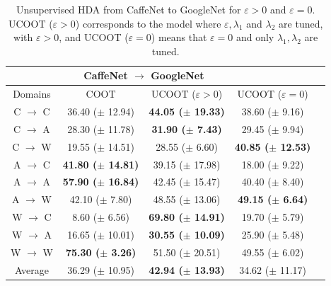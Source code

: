 \begin{table}[H]
	\begin{center}
		\begin{small}
			\begin{sc}
				\begin{tabular}{c c c c c}
					\toprule
					& \multicolumn{2}{c}{CaffeNet $\to$ GoogleNet} \\
					\midrule
					Domains & COOT & UCOOT ($\varepsilon > 0$) & UCOOT ($\varepsilon = 0$) \\
					\midrule

					C $\to$ C & 36.40 ($\pm$ 12.94) & \textbf{44.05 ($\pm$ 19.33)} & 38.60 ($\pm$ 9.16) \\
					\hline
					C $\to$ A & 28.30 ($\pm$ 11.78) & \textbf{31.90 ($\pm$ 7.43)} & 29.45 ($\pm$ 9.94) \\
					\hline
					C $\to$ W & 19.55 ($\pm$ 14.51) & 28.55 ($\pm$ 6.60) & \textbf{40.85 ($\pm$ 12.53)} \\
					\hline

					A $\to$ C & \textbf{41.80 ($\pm$ 14.81)} & 39.15 ($\pm$ 17.98) & 18.00 ($\pm$ 9.22) \\
					\hline
					A $\to$ A & \textbf{57.90 ($\pm$ 16.84)} & 42.45 ($\pm$ 15.47) & 40.40 ($\pm$ 8.40) \\
					\hline
					A $\to$ W & 42.10 ($\pm$ 7.80) & 48.55 ($\pm$ 13.06) & \textbf{49.15 ($\pm$ 6.64)} \\
					\hline

					W $\to$ C & 8.60 ($\pm$ 6.56) & \textbf{69.80 ($\pm$ 14.91)} & 19.70 ($\pm$ 5.79) \\
					\hline
					W $\to$ A & 16.65 ($\pm$ 10.01) & \textbf{30.55 ($\pm$ 10.09)} & 25.90 ($\pm$ 5.48) \\
					\hline
					W $\to$ W & \textbf{75.30 ($\pm$ 3.26)} & 51.50 ($\pm$ 20.51) & 49.55 ($\pm$ 6.02) \\
					\bottomrule
					Average & 36.29 ($\pm$ 10.95) & \textbf{42.94 ($\pm$ 13.93)} & 34.62 ($\pm$ 11.17) \\
					\bottomrule

				\end{tabular}
			\end{sc}
		\end{small}
	\end{center}
	\caption{Unsupervised HDA from CaffeNet to GoogleNet for $\varepsilon > 0$ and $\varepsilon = 0$.
  UCOOT ($\varepsilon > 0$) corresponds to the model where $\varepsilon, \lambda_1$ and $\lambda_2$
  are tuned, with $\varepsilon > 0$, and UCOOT ($\varepsilon = 0$) means that $\varepsilon = 0$
  and only $\lambda_1, \lambda_2$ are tuned. }
	\label{tab:hda2}
\end{table}

